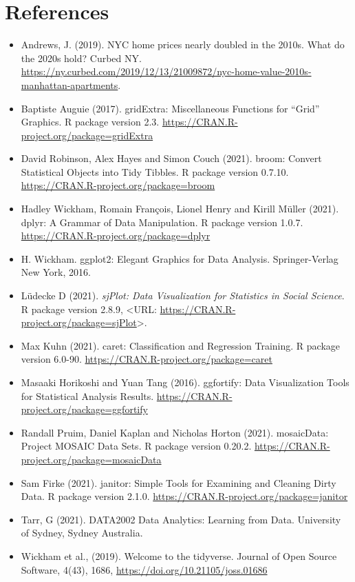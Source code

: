 \documentclass[letterpaper,9pt,twocolumn,twoside,]{pinp}
\begin{document}
\hypertarget{references}{%
\section{References}\label{references}}

\begin{itemize}
\item
  Andrews, J. (2019). NYC home prices nearly doubled in the 2010s. What
  do the 2020s hold? Curbed NY.
  \url{https://ny.curbed.com/2019/12/13/21009872/nyc-home-value-2010s-manhattan-apartments}.
\item
  Baptiste Auguie (2017). gridExtra: Miscellaneous Functions for
  ``Grid'' Graphics. R package version 2.3.
  \url{https://CRAN.R-project.org/package=gridExtra}
\item
  David Robinson, Alex Hayes and Simon Couch (2021). broom: Convert
  Statistical Objects into Tidy Tibbles. R package version 0.7.10.
  \url{https://CRAN.R-project.org/package=broom}
\item
  Hadley Wickham, Romain François, Lionel Henry and Kirill Müller
  (2021). dplyr: A Grammar of Data Manipulation. R package version
  1.0.7. \url{https://CRAN.R-project.org/package=dplyr}
\item
  H. Wickham. ggplot2: Elegant Graphics for Data Analysis.
  Springer-Verlag New York, 2016.
\item
  Lüdecke D (2021). \emph{sjPlot: Data Visualization for Statistics in
  Social Science}. R package version 2.8.9, \textless URL:
  \url{https://CRAN.R-project.org/package=sjPlot}\textgreater.
\item
  Max Kuhn (2021). caret: Classification and Regression Training. R
  package version 6.0-90. \url{https://CRAN.R-project.org/package=caret}
\item
  Masaaki Horikoshi and Yuan Tang (2016). ggfortify: Data Visualization
  Tools for Statistical Analysis Results.
  \url{https://CRAN.R-project.org/package=ggfortify}
\item
  Randall Pruim, Daniel Kaplan and Nicholas Horton (2021). mosaicData:
  Project MOSAIC Data Sets. R package version 0.20.2.
  \url{https://CRAN.R-project.org/package=mosaicData}
\item
  Sam Firke (2021). janitor: Simple Tools for Examining and Cleaning
  Dirty Data. R package version 2.1.0.
  \url{https://CRAN.R-project.org/package=janitor}
\item
  Tarr, G (2021). DATA2002 Data Analytics: Learning from Data.
  University of Sydney, Sydney Australia.
\item
  Wickham et al., (2019). Welcome to the tidyverse. Journal of Open
  Source Software, 4(43), 1686,
  \url{https://doi.org/10.21105/joss.01686}
\end{itemize}





\end{document}
